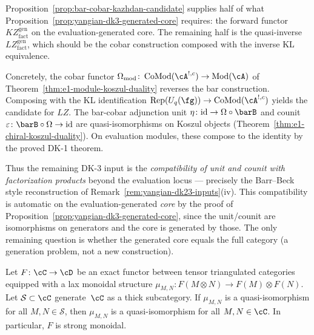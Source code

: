 \begin{remark}
\label{rem:dk3-remaining-after-barcobar}
Proposition~\ref{prop:bar-cobar-kazhdan-candidate} supplies half of
what Proposition~\ref{prop:yangian-dk3-generated-core} requires:
the forward functor $KZ_{\mathrm{fact}}^{\mathrm{gen}}$ on the
evaluation-generated core.  The remaining half is the
quasi-inverse $LZ_{\mathrm{fact}}^{\mathrm{gen}}$, which should be
the cobar construction composed with the inverse KL equivalence.

Concretely, the cobar functor
$\Omega_{\mathrm{mod}}\colon \operatorname{CoMod}(\cA^{!,c})
\to \operatorname{Mod}(\cA)$
of Theorem~\ref{thm:e1-module-koszul-duality} reverses the bar
construction.  Composing with the KL identification
$\operatorname{Rep}(U_q(\fg)) \to
\operatorname{CoMod}(\cA^{!,c})$
yields the candidate for $LZ$.
The bar-cobar adjunction unit
$\eta\colon \mathrm{id} \to \Omega \circ \barB$ and counit
$\varepsilon\colon \barB \circ \Omega \to \mathrm{id}$ are
quasi-isomorphisms on Koszul objects
\textup{(}Theorem~\textup{\ref{thm:e1-chiral-koszul-duality})}.
On evaluation modules, these compose to the identity by
the proved DK-1 theorem.

Thus the remaining DK-3 input is the \emph{compatibility of unit
and counit with factorization products} beyond the evaluation
locus --- precisely the Barr--Beck style reconstruction of
Remark~\textup{\ref{rem:yangian-dk23-inputs}(iv)}.
This compatibility is automatic on the evaluation-generated
\emph{core} by the proof of
Proposition~\textup{\ref{prop:yangian-dk3-generated-core}}, since
the unit/counit are isomorphisms on generators and the core is
generated by those.  The only remaining question is whether the
generated core equals the full category \textup{(}a generation
problem, not a new construction\textup{)}.
\end{remark}

\begin{lemma}
\label{lem:monoidal-thick-extension}
Let $F\colon \cC \to \cD$ be an exact functor between tensor
triangulated categories equipped with a lax monoidal structure
$\mu_{M,N}\colon F(M \otimes N) \to F(M) \otimes F(N)$.
Let $\mathcal{S} \subset \cC$ generate~$\cC$ as a thick subcategory.
If $\mu_{M,N}$ is a quasi-isomorphism for all $M, N \in \mathcal{S}$,
then $\mu_{M,N}$ is a quasi-isomorphism for all $M, N \in \cC$.
In particular, $F$ is strong monoidal.
\end{lemma}

